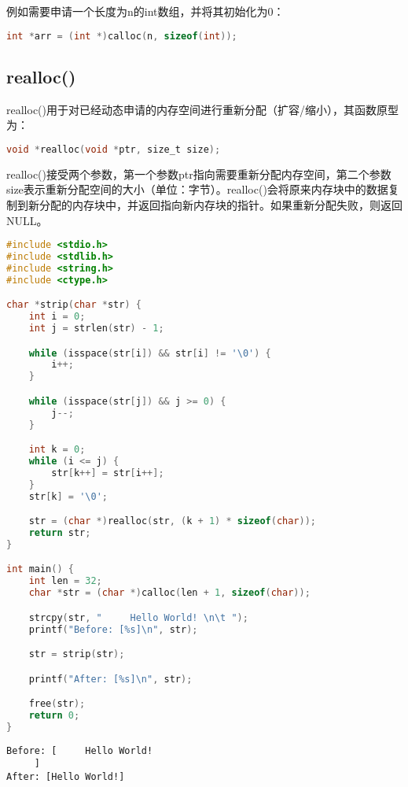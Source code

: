 例如需要申请一个长度为n的int数组，并将其初始化为0：

\vspace{-0.5cm}

\begin{lstlisting}[language=C]
int *arr = (int *)calloc(n, sizeof(int));
\end{lstlisting}

\vspace{0.5cm}

\subsection{realloc()}

realloc()用于对已经动态申请的内存空间进行重新分配（扩容/缩小），其函数原型为：

\vspace{-0.5cm}

\begin{lstlisting}[language=C]
void *realloc(void *ptr, size_t size);
\end{lstlisting}

realloc()接受两个参数，第一个参数ptr指向需要重新分配内存空间，第二个参数size表示重新分配空间的大小（单位：字节）。realloc()会将原来内存块中的数据复制到新分配的内存块中，并返回指向新内存块的指针。如果重新分配失败，则返回NULL。\\


\begin{lstlisting}[language=C]
#include <stdio.h>
#include <stdlib.h>
#include <string.h>
#include <ctype.h>

char *strip(char *str) {
    int i = 0;
    int j = strlen(str) - 1;

    while (isspace(str[i]) && str[i] != '\0') {
        i++;
    }

    while (isspace(str[j]) && j >= 0) {
        j--;
    }

    int k = 0;
    while (i <= j) {
        str[k++] = str[i++];
    }
    str[k] = '\0';

    str = (char *)realloc(str, (k + 1) * sizeof(char));
    return str;
}

int main() {
    int len = 32;
    char *str = (char *)calloc(len + 1, sizeof(char));

    strcpy(str, "     Hello World! \n\t ");
    printf("Before: [%s]\n", str);

    str = strip(str);

    printf("After: [%s]\n", str);

    free(str);
    return 0;
}
\end{lstlisting}

\begin{tcolorbox}
    \begin{verbatim}
Before: [     Hello World! 
     ]
After: [Hello World!]
	\end{verbatim}
\end{tcolorbox}

\newpage